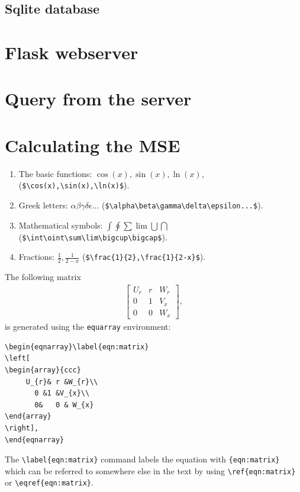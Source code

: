\documentclass[11pt]{book}
\begin{document}
\subsection{Sqlite database}


\section{Flask webserver}
\section{Query from the server}
\section{Calculating the MSE}




\begin{enumerate}
\item The basic functions: $\cos(x),  \sin(x),   \ln(x) $,  (\verb+$\cos(x),\sin(x),\ln(x)$+). 
\item Greek letters: $\alpha \beta \gamma \delta\epsilon...$ (\verb+$\alpha\beta\gamma\delta\epsilon...$+).
\item Mathematical symbols: $\int  \oint \sum\lim\bigcup \bigcap$
 (\verb+$\int\oint\sum\lim\bigcup\bigcap$+).
\item Fractions: $\frac{1}{2},\frac{1}{2-x}$ (\verb+$\frac{1}{2},\frac{1}{2-x}$+).
\end{enumerate}

The following matrix 
\begin{eqnarray}\label{eqn:matrix}
\left[
\begin{array}{ccc}
	 U_{r}&     r       &   W_{r}	\\
	   0       &	1      &  V_{x}	\\
	   0	   &	0      &  W_{x}
\end{array}
\right], 
\end{eqnarray}
is generated using  the \verb+equarray+ environment:
\begin{verbatim}
\begin{eqnarray}\label{eqn:matrix}
\left[
\begin{array}{ccc}
	 U_{r}& r &W_{r}\\
	   0 &1 &V_{x}\\
	   0&	0 & W_{x}
\end{array}
\right], 
\end{eqnarray}
\end{verbatim}
The \verb+\label{eqn:matrix}+ command labels the equation with \verb+{eqn:matrix}+ which can 
be referred  to somewhere else in the text by using \verb+\ref{eqn:matrix}+ or  \verb+\eqref{eqn:matrix}+.
\end{document}
